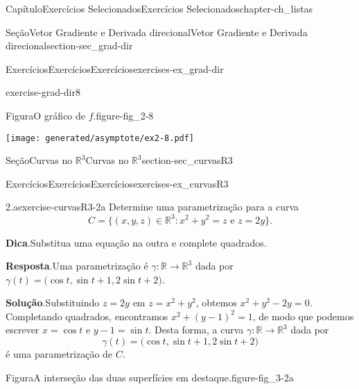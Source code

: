 \documentclass[oneside,10pt,]{book}
\newcommand{\blocktitlefont}{\relax}
\numberwithin{equation}{section}
\newcommand{\R}{\mathbb R}
\begin{document}
\begin{chapterptx}{Capítulo}{Exercícios Selecionados}{}{Exercícios Selecionados}{}{}{chapter-ch_listas}
\begin{sectionptx}{Seção}{Vetor Gradiente e Derivada direcional}{}{Vetor Gradiente e Derivada direcional}{}{}{section-sec_grad-dir}
\begin{exercises-subsection-numberless}{Exercícios}{Exercícios}{}{Exercícios}{}{}{exercises-ex_grad-dir}
\begin{divisionexercise}{8}{}{}{exercise-grad-dir8}
\begin{figureptx}{Figura}{O gráfico de \(f\).}{figure-fig_2-8}{}%
\begin{image}{0}{1}{0}{}%
\texttt{[image: generated/asymptote/ex2-8.pdf]}
\end{image}%
\tcblower
\end{figureptx}%
\end{divisionexercise}%
\end{exercises-subsection-numberless}
\end{sectionptx}
%
%
\typeout{************************************************}
\typeout{Seção 1.8 Curvas no \(\R^3\)}
\typeout{************************************************}
%
\begin{sectionptx}{Seção}{Curvas no \(\R^3\)}{}{Curvas no \(\R^3\)}{}{}{section-sec_curvasR3}
%
%
\typeout{************************************************}
\typeout{************************************************}
%
\begin{exercises-subsection-numberless}{Exercícios}{Exercícios}{}{Exercícios}{}{}{exercises-ex_curvasR3}
\begin{divisionexercise}{2.a}{}{}{exercise-curvasR3-2a}%
Determine uma parametrização para a curva%
\begin{equation*}
C = \big\{
(x,y,z) \in \R^3\colon x^2+y^2=z\text{ e }z=2y\big\}.
\end{equation*}
%
\par\smallskip%
\noindent\textbf{\blocktitlefont Dica}.\hypertarget{hint-curvasR3-2a-b}{}\quad{}Substitua uma equação na outra e complete quadrados.%
\par\smallskip%
\noindent\textbf{\blocktitlefont Resposta}.\hypertarget{answer-curvasR3-2a-c}{}\quad{}Uma parametrização é \(\gamma\colon\R\to\R^3\) dada por \(\gamma(t) = \big( \cos t, \sin t + 1 , 2 \sin t +
2\big)\).%
\par\smallskip%
\noindent\textbf{\blocktitlefont Solução}.\hypertarget{solution-curvasR3-2a-d}{}\quad{}Substituindo \(z=2y\) em \(z = x^2 + y^2\), obtemos \(x^2 + y^2 - 2y = 0\). Completando quadrados, encontramos \(x^2 + (y-1)^2 = 1\), de modo que podemos escrever \(x =
\cos t\) e \(y-1 = \sin t\). Desta forma, a curva \(\gamma\colon\R\to\R^3\) dada por%
\begin{equation*}
\gamma(t) = \big( \cos
t, \sin t + 1 , 2 \sin t + 2\big)
\end{equation*}
é uma parametrização de \(C\).%
\begin{figureptx}{Figura}{A interseção das duas superfícies em destaque.}{figure-fig_3-2a}{}%

\end{figureptx}
\end{divisionexercise}
\end{exercises-subsection-numberless}
\end{sectionptx}
\end{chapterptx}
\end{document}
